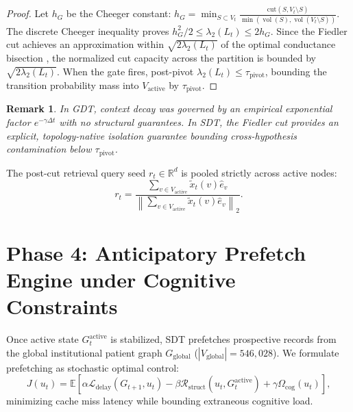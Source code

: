 \documentclass[10pt, onecolumn]{article}
\newtheorem{remark}[theorem]{Remark}
\DeclareMathOperator{\vol}{vol}
\newcommand{\R}{\mathbb{R}}
\newcommand{\E}{\mathbb{E}}
\newcommand{\norm}[1]{\left\lVert#1\right\rVert}
\begin{document}
\begin{proof}
Let $h_G$ be the Cheeger constant: $h_G = \min_{S \subset V_t} \frac{\mathrm{cut}(S, V_t \setminus S)}{\min(\vol(S), \vol(V_t \setminus S))}$. The discrete Cheeger inequality proves $h_G^2 / 2 \le \lambda_2(L_t) \le 2 h_G$. Since the Fiedler cut achieves an approximation within $\sqrt{2\lambda_2(L_t)}$ of the optimal conductance bisection \cite{spielman2007spectral}, the normalized cut capacity across the partition is bounded by $\sqrt{2\lambda_2(L_t)}$. When the gate fires, post-pivot $\lambda_2(L_t) \le \tau_{\text{pivot}}$, bounding the transition probability mass into $V_{\text{active}}$ by $\tau_{\text{pivot}}$.
\end{proof}

\begin{remark}
In GDT, context decay was governed by an empirical exponential factor $e^{-\gamma \Delta t}$ with no structural guarantees. In SDT, the Fiedler cut provides an explicit, topology-native isolation guarantee bounding cross-hypothesis contamination below $\tau_{\text{pivot}}$.
\end{remark}

The post-cut retrieval query seed $r_t \in \R^d$ is pooled strictly across active nodes:
\begin{equation}
  r_t = \frac{\sum_{v \in V_{\text{active}}} \tilde{x}_t(v) \hat{e}_v}{\norm{\sum_{v \in V_{\text{active}}} \tilde{x}_t(v) \hat{e}_v}_2}.
  \label{eq:retrieval_seed}
\end{equation}

\section{Phase 4: Anticipatory Prefetch Engine under Cognitive Constraints}
\label{sec:phase4}

Once active state $G_t^{\text{active}}$ is stabilized, SDT prefetches prospective records from the global institutional patient graph $G_{\text{global}}$ ($|V_{\text{global}}| = 546{,}028$). We formulate prefetching as stochastic optimal control:
\begin{equation}
  J(u_t) = \E\!\left[ \alpha \mathcal{L}_{\text{delay}}(G_{t+1}, u_t) - \beta \mathcal{R}_{\text{struct}}(u_t, G_t^{\text{active}}) + \gamma \Omega_{\text{cog}}(u_t) \right],
  \label{eq:control_cost}
\end{equation}
minimizing cache miss latency while bounding extraneous cognitive load.
\end{document}
